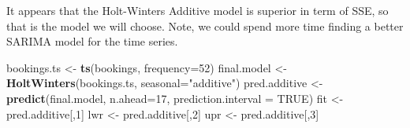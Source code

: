 \documentclass[]{article}
\newenvironment{Shaded}{\begin{snugshade}}{\end{snugshade}}
\newcommand{\DataTypeTok}[1]{\textcolor[rgb]{0.13,0.29,0.53}{#1}}
\newcommand{\DecValTok}[1]{\textcolor[rgb]{0.00,0.00,0.81}{#1}}
\newcommand{\KeywordTok}[1]{\textcolor[rgb]{0.13,0.29,0.53}{\textbf{#1}}}
\newcommand{\NormalTok}[1]{#1}
\newcommand{\OtherTok}[1]{\textcolor[rgb]{0.56,0.35,0.01}{#1}}
\newcommand{\StringTok}[1]{\textcolor[rgb]{0.31,0.60,0.02}{#1}}
\begin{document}
It appears that the Holt-Winters Additive model is superior in term of
SSE, so that is the model we will choose. Note, we could spend more time
finding a better SARIMA model for the time series.

\begin{Shaded}
\begin{Highlighting}[]
\NormalTok{bookings.ts <-}\StringTok{ }\KeywordTok{ts}\NormalTok{(bookings, }\DataTypeTok{frequency=}\DecValTok{52}\NormalTok{)}
\NormalTok{final.model <-}\StringTok{ }\KeywordTok{HoltWinters}\NormalTok{(bookings.ts, }\DataTypeTok{seasonal=}\StringTok{"additive"}\NormalTok{)}
\NormalTok{pred.additive <-}\StringTok{ }\KeywordTok{predict}\NormalTok{(final.model, }\DataTypeTok{n.ahead=}\DecValTok{17}\NormalTok{, }\DataTypeTok{prediction.interval =} \OtherTok{TRUE}\NormalTok{)}
\NormalTok{fit <-}\StringTok{ }\NormalTok{pred.additive[,}\DecValTok{1}\NormalTok{]}
\NormalTok{lwr <-}\StringTok{ }\NormalTok{pred.additive[,}\DecValTok{2}\NormalTok{]}
\NormalTok{upr <-}\StringTok{ }\NormalTok{pred.additive[,}\DecValTok{3}\NormalTok{]}
\end{Highlighting}
\end{Shaded}
\end{document}
